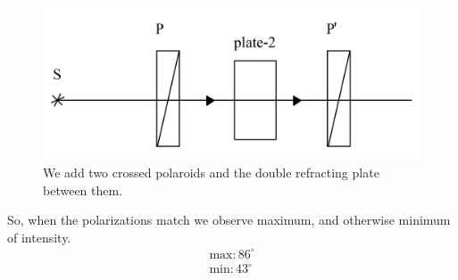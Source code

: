 \begin{minipage}{0.55\textwidth}
    \begin{figure}[h]
    \centering
    \includegraphics[width=1\textwidth]{images/crystplast2.png}
    \caption{We add two crossed polaroids and the double refracting plate between them.}
\end{figure}
\end{minipage}
\hfill
\begin{minipage}{0.35\textwidth}
    So, when the polarizations match we observe maximum, and otherwise minimum of intensity.
    \begin{align*}
        \text{max} \colon 86^\circ\\
        \text{min} \colon 43^\circ
    \end{align*}
\end{minipage}
